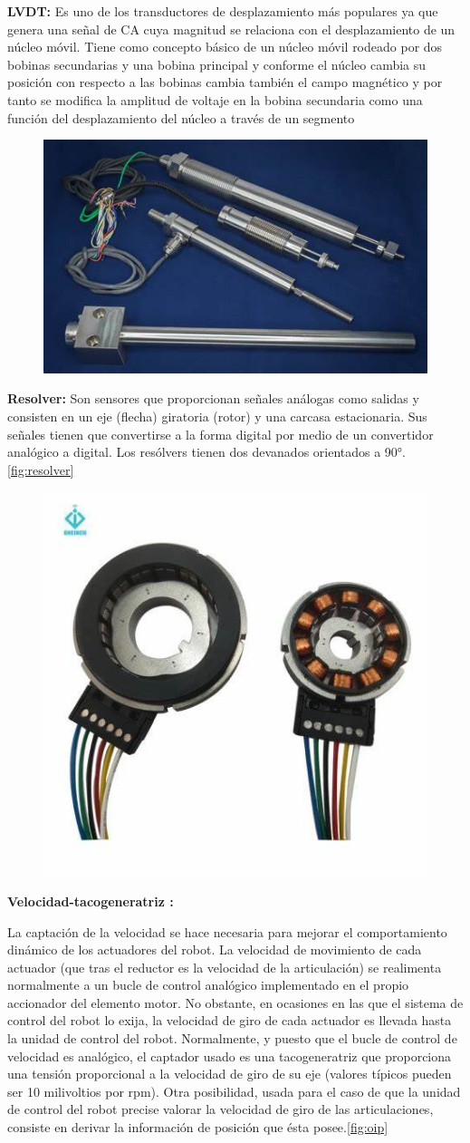 \textbf{LVDT:} Es uno de los transductores de desplazamiento más populares ya que genera una señal de CA cuya magnitud se relaciona con el desplazamiento de un núcleo móvil. Tiene como concepto básico de un núcleo móvil rodeado por dos bobinas secundarias y una bobina principal y conforme el núcleo cambia su posición con respecto a las bobinas cambia también el campo magnético y por tanto se modifica la amplitud de voltaje en la bobina secundaria como una función del desplazamiento del núcleo a través de un segmento 



\begin{figure}[h]
	\centering
	\includegraphics[width=0.2\linewidth, height=0.2\textheight]{img/LVDT}
	\caption{}
	\label{fig:lvdt}
\end{figure}




\textbf{Resolver:} Son sensores que proporcionan señales análogas como salidas y consisten en un eje (flecha) giratoria (rotor) y una carcasa estacionaria. Sus señales tienen que convertirse a la forma digital por medio de un convertidor analógico a digital. Los resólvers tienen dos devanados orientados a 90°. \autoref{fig:resolver}

\begin{figure}[!]
	\centering
	\includegraphics[width=0.2\linewidth, height=0.15\textheight]{img/resolver}
	\caption[Resolver]{}
	\label{fig:resolver}
\end{figure}




\textbf{Velocidad-tacogeneratriz :}

La captación de la velocidad se hace necesaria para mejorar el comportamiento dinámico de los actuadores del robot. La velocidad de movimiento de cada actuador (que tras el reductor es la velocidad de la articulación) se realimenta normalmente a un bucle de control analógico implementado en el propio accionador del elemento motor. No obstante, en ocasiones en las que el sistema de control del robot lo exija, la velocidad de giro de cada actuador es llevada hasta la unidad de control del robot. Normalmente, y puesto que el bucle de control de velocidad es analógico, el captador usado es una tacogeneratriz que proporciona una tensión proporcional a la velocidad de giro de su eje (valores típicos pueden ser 10 milivoltios por rpm). Otra posibilidad, usada para el caso de que la unidad de control del robot precise valorar la velocidad de giro de las articulaciones, consiste en derivar la información de posición que ésta posee.\autoref{fig:oip}



